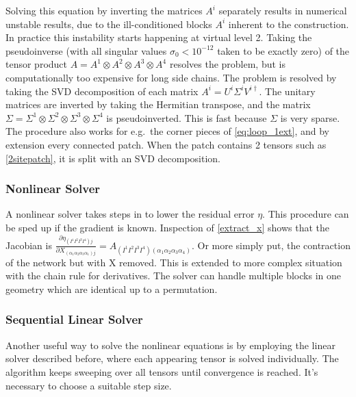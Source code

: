 \documentclass[twocolumn]{article}
\newcounter{a}
\newcounter{b}
\begin{document}
Solving this equation by inverting the matrices $A^i$ separately results in numerical unstable results, due to the ill-conditioned blocks $A^i$ inherent to the construction. In practice this instability starts happening at virtual level 2. Taking the pseudoinverse (with all singular values $\sigma_0<10^{-12}$ taken to be exactly zero) of the tensor product  $A = A^1 \otimes A^2 \otimes A^3 \otimes A^4$  resolves the problem, but is  computationally too expensive for long side chains. The problem is resolved by taking the SVD decomposition of each matrix $A^i = U^i \Sigma^i V^{i \dagger}$. The unitary matrices are inverted by taking the Hermitian transpose, and the matrix $\Sigma = \Sigma^1 \otimes \Sigma^2 \otimes \Sigma^3 \otimes \Sigma^4$ is pseudoinverted. This is fast because $\Sigma$ is very sparse. The procedure also works for e.g.\ the corner pieces of \cref{eq:loop_1ext}, and by extension every connected patch. When the patch contains 2 tensors such as \cref{2sitepatch}, it is split with an SVD decomposition.

\subsubsection{Nonlinear Solver}
A nonlinear solver takes steps in to lower the residual error $\eta$. This procedure can be sped up if the gradient is known. Inspection of \cref{extract_x} shows that the Jacobian is $\frac{\partial  \eta_{ (I^1 I^2 I^3 I^4) j }  }  { \partial X_{ (\alpha_1 \alpha_2 \alpha_3 \alpha_1)  j } }   = A_{ (I^1 I^2 I^3 I^4) (\alpha_1 \alpha_2 \alpha_3 \alpha_4) } $. Or more simply put, the contraction of the network but with X removed. This is extended to more complex situation with the chain rule for derivatives. The solver can handle multiple blocks in one geometry which are identical up to a permutation.

\subsubsection{Sequential Linear Solver}
Another useful way to solve the nonlinear equations is by employing the linear solver described before, where each appearing tensor is solved individually. The algorithm keeps sweeping over all tensors until convergence is reached. It's necessary to choose a suitable step size.

\end{document}
